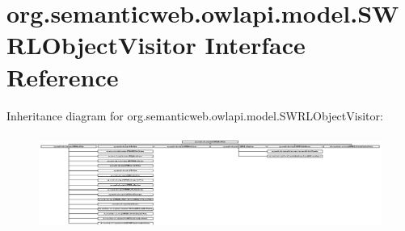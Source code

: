 \hypertarget{interfaceorg_1_1semanticweb_1_1owlapi_1_1model_1_1_s_w_r_l_object_visitor}{\section{org.\-semanticweb.\-owlapi.\-model.\-S\-W\-R\-L\-Object\-Visitor Interface Reference}
\label{interfaceorg_1_1semanticweb_1_1owlapi_1_1model_1_1_s_w_r_l_object_visitor}
}
Inheritance diagram for org.\-semanticweb.\-owlapi.\-model.\-S\-W\-R\-L\-Object\-Visitor\-:\begin{figure}[H]
\begin{center}
\leavevmode
\includegraphics[height=3.111111cm]{interfaceorg_1_1semanticweb_1_1owlapi_1_1model_1_1_s_w_r_l_object_visitor}
\end{center}
\end{figure}
